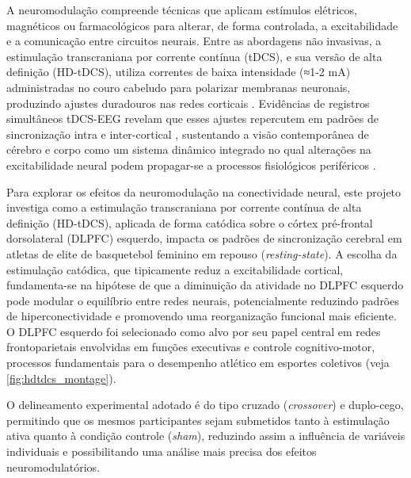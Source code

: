 A neuromodulação compreende técnicas que aplicam estímulos elétricos, magnéticos ou farmacológicos para alterar, de forma controlada, a excitabilidade e a comunicação entre circuitos neurais. Entre as abordagens não invasivas, a estimulação transcraniana por corrente contínua (tDCS), e sua versão de alta definição (HD-tDCS), utiliza correntes de baixa intensidade (≈1-2 mA) administradas no couro cabeludo para polarizar membranas neuronais, produzindo ajustes duradouros nas redes corticais \cite{nitsche2000excitability,stagg2011physiological}. Evidências de registros simultâneos tDCS-EEG revelam que esses ajustes repercutem em padrões de sincronização intra e inter-cortical \cite{kunze2014high}, sustentando a visão contemporânea de cérebro e corpo como um sistema dinâmico integrado no qual alterações na excitabilidade neural podem propagar-se a processos fisiológicos periféricos \cite{criscuolo2022cognition}.

Para explorar os efeitos da neuromodulação na conectividade neural, este projeto investiga como a estimulação transcraniana por corrente contínua de alta definição (HD-tDCS), aplicada de forma catódica sobre o córtex pré-frontal dorsolateral (DLPFC) esquerdo, impacta os padrões de sincronização cerebral em atletas de elite de basquetebol feminino em repouso (\textit{resting-state}). A escolha da estimulação catódica, que tipicamente reduz a excitabilidade cortical, fundamenta-se na hipótese de que a diminuição da atividade no DLPFC esquerdo pode modular o equilíbrio entre redes neurais, potencialmente reduzindo padrões de hiperconectividade e promovendo uma reorganização funcional mais eficiente. O DLPFC esquerdo foi selecionado como alvo por seu papel central em redes frontoparietais envolvidas em funções executivas e controle cognitivo-motor, processos fundamentais para o desempenho atlético em esportes coletivos (veja \ref{fig:hdtdcs_montage}). 

O delineamento experimental adotado é do tipo cruzado (\textit{crossover}) e duplo-cego, permitindo que os mesmos participantes sejam submetidos tanto à estimulação ativa quanto à condição controle (\textit{sham}), reduzindo assim a influência de variáveis individuais e possibilitando uma análise mais precisa dos efeitos neuromodulatórios.

